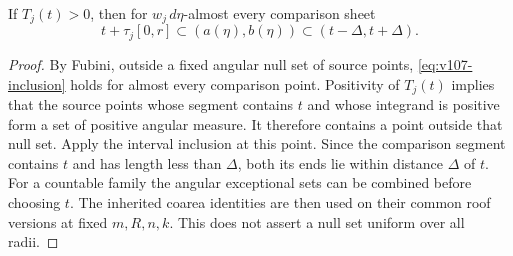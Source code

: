 \begin{lemma}
\label{lem:v107-window}
If $T_j(t)>0$, then for $w_j\,d\eta$-almost every comparison sheet
\begin{equation}\label{eq:v107-window}
 t+\tau_j[0,r]\subset(a(\eta),b(\eta))
                    \subset(t-\Delta,t+\Delta).
\end{equation}
\end{lemma}
\begin{proof}
By Fubini, outside a fixed angular null set of source points,
\eqref{eq:v107-inclusion} holds for almost every comparison point.
Positivity of $T_j(t)$ implies that the source points whose segment
contains $t$ and whose integrand is positive form a set of positive
angular measure. It therefore contains a point outside that null
set. Apply the interval inclusion at this point. Since the comparison
segment contains $t$ and has length less than $\Delta$, both its
ends lie within distance $\Delta$ of $t$.
For a countable family the angular exceptional sets can be combined
before choosing $t$. The inherited coarea identities are then used
on their common roof versions at fixed $m,R,n,k$. This does not
assert a null set uniform over all radii.
\end{proof}

